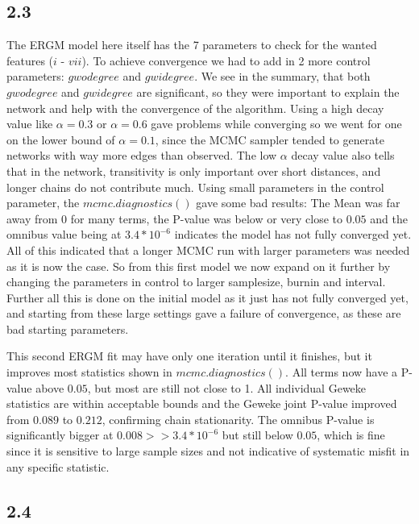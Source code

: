 \documentclass[
]{article}
\begin{document}
\subsection{2.3}\label{section-4}

The ERGM model here itself has the 7 parameters to check for the wanted
features (\(i\) - \(vii\)). To achieve convergence we had to add in 2
more control parameters: \(gwodegree\) and \(gwidegree\). We see in the
summary, that both \(gwodegree\) and \(gwidegree\) are significant, so
they were important to explain the network and help with the convergence
of the algorithm. Using a high decay value like \(\alpha = 0.3\) or
\(\alpha = 0.6\) gave problems while converging so we went for one on
the lower bound of \(\alpha = 0.1\), since the MCMC sampler tended to
generate networks with way more edges than observed. The low \(\alpha\)
decay value also tells that in the network, transitivity is only
important over short distances, and longer chains do not contribute
much. Using small parameters in the control parameter, the
\(mcmc.diagnostics()\) gave some bad results: The Mean was far away from
0 for many terms, the P-value was below or very close to \(0.05\) and
the omnibus value being at \(3.4*10^{-6}\) indicates the model has not
fully converged yet. All of this indicated that a longer MCMC run with
larger parameters was needed as it is now the case. So from this first
model we now expand on it further by changing the parameters in control
to larger samplesize, burnin and interval. Further all this is done on
the initial model as it just has not fully converged yet, and starting
from these large settings gave a failure of convergence, as these are
bad starting parameters.

This second ERGM fit may have only one iteration until it finishes, but
it improves most statistics shown in \(mcmc.diagnostics()\). All terms
now have a P-value above \(0.05\), but most are still not close to 1.
All individual Geweke statistics are within acceptable bounds and the
Geweke joint P-value improved from \(0.089\) to \(0.212\), confirming
chain stationarity. The omnibus P-value is significantly bigger at
\(0.008>>3.4*10^{-6}\) but still below \(0.05\), which is fine since it
is sensitive to large sample sizes and not indicative of systematic
misfit in any specific statistic.

\subsection{2.4}\label{section-5}
\end{document}
